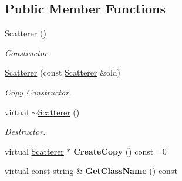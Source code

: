 \subsection*{Public Member Functions}
\begin{DoxyCompactItemize}
\item 
\mbox{\label{class_obj_cryst_1_1_scatterer_a5367833f94dd2daeed41ffe3836c1c64}} 
\mbox{\hyperlink{class_obj_cryst_1_1_scatterer_a5367833f94dd2daeed41ffe3836c1c64}{Scatterer}} ()
\begin{DoxyCompactList}\small\item\em Constructor. \end{DoxyCompactList}\item 
\mbox{\label{class_obj_cryst_1_1_scatterer_a0d568f50de46100c0faff213dde8544f}} 
\mbox{\hyperlink{class_obj_cryst_1_1_scatterer_a0d568f50de46100c0faff213dde8544f}{Scatterer}} (const \mbox{\hyperlink{class_obj_cryst_1_1_scatterer}{Scatterer}} \&old)
\begin{DoxyCompactList}\small\item\em Copy Constructor. \end{DoxyCompactList}\item 
\mbox{\label{class_obj_cryst_1_1_scatterer_a4078a38ee27cc98cb4487810a3f803fc}} 
virtual \mbox{\hyperlink{class_obj_cryst_1_1_scatterer_a4078a38ee27cc98cb4487810a3f803fc}{$\sim$\+Scatterer}} ()
\begin{DoxyCompactList}\small\item\em Destructor. \end{DoxyCompactList}\item 
\mbox{\label{class_obj_cryst_1_1_scatterer_a4d374adcff97163a24492d362f6def73}} 
virtual \mbox{\hyperlink{class_obj_cryst_1_1_scatterer}{Scatterer}} $\ast$ {\bfseries Create\+Copy} () const =0
\item 
\mbox{\label{class_obj_cryst_1_1_scatterer_a01245f0d81730db769ebaf33fbb87942}} 
virtual const string \& {\bfseries Get\+Class\+Name} () const
\item 
\mbox{\label{class_obj_cryst_1_1_scatterer_a18d63b8e79b35942902244c555ea33ef}} 

\end{DoxyCompactItemize}
